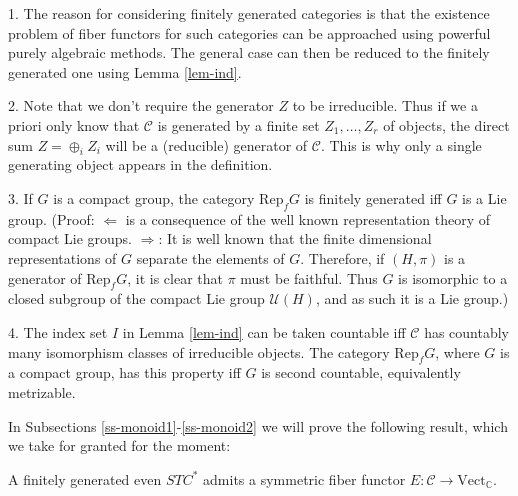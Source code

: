 \documentclass[11pt]{article}
\theoremstyle{definition}
\theoremstyle{definition}
\theoremstyle{remark}
\newcommand{\Vect}{\mathrm{Vect}}
\def\2#1{{\mathcal #1}}
\def\7#1{{\mathbb #1}}
\newcommand{\Rep}{\mathrm{Rep}}
\newcommand{\rarr}{\rightarrow}
\begin{document}
\brem \label{rem-fingen} 1. The reason for considering finitely
generated categories is that the existence problem of fiber functors
for such categories can be approached using powerful purely algebraic
methods. The general case can then be reduced to the finitely
generated one using Lemma \ref{lem-ind}.

2. Note that we don't require the generator $Z$ to be irreducible. Thus if
we a priori only know that $\2C$ is generated by a finite set $Z_1,\ldots,Z_r$ of objects, the
direct sum  $Z=\oplus_i Z_i$ will be a (reducible) generator of $\2C$. This is why only a single
generating object appears in the definition.

3. If $G$ is a compact group, the category $\Rep_fG$ is finitely generated iff $G$ is a Lie group.
(Proof: $\Leftarrow$ is a consequence of the well known representation theory of compact Lie
groups. $\Rightarrow$: It is well known that the finite dimensional representations of $G$
separate the elements of $G$.  Therefore, if $(H,\pi)$ is a generator of $\Rep_fG$, it is clear that
$\pi$ must be faithful. Thus $G$ is isomorphic to a closed subgroup of the compact Lie group
$\2U(H)$, and as such it is a Lie group.)

4. The index set $I$ in Lemma \ref{lem-ind} can be taken countable iff
$\2C$ has countably many isomorphism classes of irreducible objects.
The category $\Rep_fG$, where $G$ is a compact group, has this
property iff $G$ is second countable, equivalently metrizable.  \erem

In Subsections \ref{ss-monoid1}-\ref{ss-monoid2} we will prove the following result, which we take
for granted for the moment:

\btheor \label{theor-D} 
A finitely generated even $STC^*$ admits a symmetric  fiber functor $E: \2C\rarr\Vect_\7C$.  
\etheor
\end{document}
